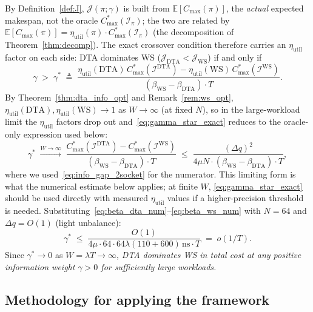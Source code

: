 \documentclass[11pt,a4paper]{report}
\begin{document}
\noindent By Definition~\ref{def:J}, $\mathcal{J}(\pi;\gamma)$ is built from
$\mathbb{E}[C_{\max}(\pi)]$, the \emph{actual} expected makespan, not the
oracle $C_{\max}^*(\mathcal{I}_\pi)$; the two are related by
$\mathbb{E}[C_{\max}(\pi)] = \eta_{\mathrm{util}}(\pi)\cdot C_{\max}^*(\mathcal{I}_\pi)$
(the decomposition of Theorem~\ref{thm:decomp}). The exact crossover condition
therefore carries an $\eta_{\mathrm{util}}$ factor on each side: DTA dominates
WS ($\mathcal{J}_{\mathrm{DTA}} < \mathcal{J}_{\mathrm{WS}}$) if and only if
\begin{equation}\label{eq:gamma_star_exact}
  \gamma \;>\; \gamma^*
  \;\triangleq\;
  \frac{\eta_{\mathrm{util}}(\mathrm{DTA})\,C_{\max}^*(\mathcal{I}^{\mathrm{DTA}})
        - \eta_{\mathrm{util}}(\mathrm{WS})\,C_{\max}^*(\mathcal{I}^{\mathrm{WS}})}{
        (\beta_{\mathrm{WS}} - \beta_{\mathrm{DTA}})\cdot T}.
\end{equation}
By Theorem~\ref{thm:dta_info_opt} and Remark~\ref{rem:ws_opt},
$\eta_{\mathrm{util}}(\mathrm{DTA}), \eta_{\mathrm{util}}(\mathrm{WS})
\to 1$ as $W\to\infty$ (at fixed $N$), so in the large-workload limit the
$\eta_{\mathrm{util}}$ factors drop out and~\eqref{eq:gamma_star_exact}
reduces to the oracle-only expression used below:
\begin{equation}\label{eq:gamma_star}
  \gamma^*
  \;\xrightarrow{W\to\infty}\;
  \frac{C_{\max}^*(\mathcal{I}^{\mathrm{DTA}}) - C_{\max}^*(\mathcal{I}^{\mathrm{WS}})}{
        (\beta_{\mathrm{WS}} - \beta_{\mathrm{DTA}})\cdot T}
  \;\leq\;
  \frac{(\Delta q)^2}{4\mu N \cdot (\beta_{\mathrm{WS}}-\beta_{\mathrm{DTA}})\cdot T},
\end{equation}
where we used~\eqref{eq:info_gap_2socket} for the numerator. This limiting
form is what the numerical estimate below applies; at finite $W$,
\eqref{eq:gamma_star_exact} should be used directly with measured
$\eta_{\mathrm{util}}$ values if a higher-precision threshold is needed.
Substituting~\eqref{eq:beta_dta_num}--\eqref{eq:beta_ws_num}
with $N=64$ and $\Delta q = O(1)$ (light unbalance):
\[
  \gamma^*
  \;\leq\;
  \frac{O(1)}{4\mu\cdot 64 \cdot 64\lambda(110+600)\,\mathrm{ns}\cdot T}
  \;=\; o(1/T).
\]
Since $\gamma^* \to 0$ as $W = \lambda T \to\infty$, \emph{DTA dominates
WS in total cost at any positive information weight $\gamma>0$ for
sufficiently large workloads.}

\subsection{Methodology for applying the framework}
\end{document}
